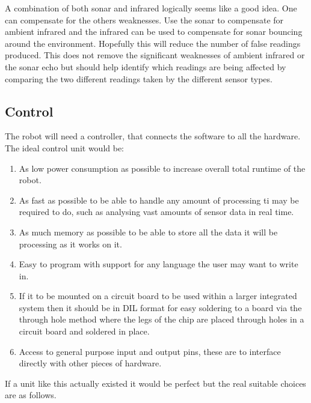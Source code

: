 A combination of both sonar and infrared logically seems like a good idea.  One can compensate for the others weaknesses.  Use the sonar to compensate for ambient infrared and the infrared can be used to compensate for sonar bouncing around the environment.  Hopefully this will reduce the number of false readings produced.  This does not remove the significant weaknesses of ambient infrared or the sonar echo but should help identify which readings are being affected by comparing the two different readings taken by the different sensor types.
\subsection{Control}
The robot will need a controller, that connects the software to all the hardware.
\\The ideal control unit would be:
\begin{enumerate}
\item As low power consumption as possible to increase overall total runtime of the robot.
\item As fast as possible to be able to handle any amount of processing ti may be required to do, such as analysing vast amounts of sensor data in real time.
\item As much memory as possible to be able to store all the data it will be processing as it works on it.
\item Easy to program with support for any language the user may want to write in.
\item If it to be mounted on a circuit board to be used within a larger integrated system then it should be in DIL format for easy soldering to a board via the through hole method where the legs of the chip are placed through holes in a circuit board and soldered in place.
\item Access to general purpose input and output pins, these are to interface directly with other pieces of hardware.
\end{enumerate}
If a unit like this actually existed it would be perfect but the real suitable choices are as follows.
